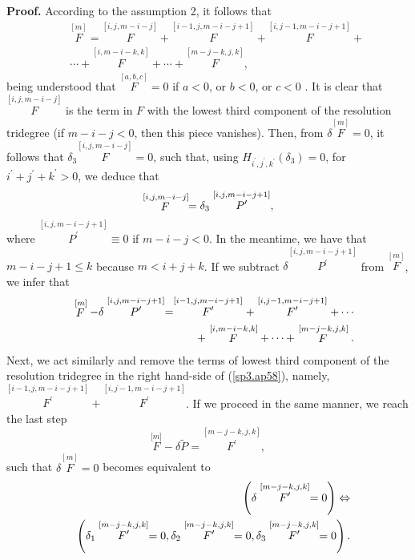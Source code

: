 \documentclass[a4paper,12pt]{article}
\begin{document}
{\textbf{Proof.}} According to the assumption 2, it follows that 
\begin{eqnarray}
&&\stackrel{[m]}{F}=\stackrel{[i,j,m-i-j]}{F}+\stackrel{[i-1,j,m-i-j+1]}{F}+%
\stackrel{[i,j-1,m-i-j+1]}{F}+  \nonumber \\
&&\cdots +\stackrel{[i,m-i-k,k]}{F}+\cdots +\stackrel{[m-j-k,j,k]}{F},
\label{sp3.ap56}
\end{eqnarray}
being understood that $\stackrel{[a,b,c]}{F}=0$ if $a<0$, or $b<0$, or $c<0$%
. It is clear that $\stackrel{[i,j,m-i-j]}{F}$ is the term in $F$ with the
lowest third component of the resolution tridegree (if $m-i-j<0$, then this
piece vanishes). Then, from $\delta \stackrel{[m]}{F}=0$, it follows that $%
\delta _{3}\stackrel{[i,j,m-i-j]}{F}=0$, such that, using $H_{i^{\prime
},j^{\prime },k^{\prime }}\left( \delta _{3}\right) =0$, for $i^{\prime
}+j^{\prime }+k^{\prime }>0$, we deduce that 
\begin{equation}
\stackrel{\lbrack i,j,m-i-j]}{F}=\delta _{3}\stackrel{[i,j,m-i-j+1]}{%
P^{\prime }},  \label{sp3.ap57}
\end{equation}
where $\stackrel{[i,j,m-i-j+1]}{P^{\prime }}\equiv 0$ if $m-i-j<0$. In the
meantime, we have that $m-i-j+1\leq k$ because $m<i+j+k$. If we subtract $%
\delta \stackrel{[i,j,m-i-j+1]}{P^{\prime }}$ from $\stackrel{[m]}{F}$, we
infer that 
\begin{eqnarray}
&&\stackrel{[m]}{F}-\delta \stackrel{[i,j,m-i-j+1]}{P^{\prime }}=\stackrel{%
[i-1,j,m-i-j+1]}{F^{\prime }}+\stackrel{[i,j-1,m-i-j+1]}{F^{\prime }}+\cdots
\nonumber \\
&&+\stackrel{[i,m-i-k,k]}{F}+\cdots +\stackrel{[m-j-k,j,k]}{F}.
\label{sp3.ap58}
\end{eqnarray}
Next, we act similarly and remove the terms of lowest third component of the
resolution tridegree in the right hand-side of (\ref{sp3.ap58}), namely, $%
\stackrel{[i-1,j,m-i-j+1]}{F^{\prime }}+\stackrel{[i,j-1,m-i-j+1]}{F^{\prime
}}$. If we proceed in the same manner, we reach the last step 
\begin{equation}
\stackrel{\lbrack m]}{F}-\delta \tilde{P}=\stackrel{[m-j-k,j,k]}{F^{\prime }}%
,  \label{sp3.ap59}
\end{equation}
such that $\delta \stackrel{[m]}{F}=0$ becomes equivalent to 
\begin{eqnarray}
&&\left( \delta \stackrel{[m-j-k,j,k]}{F^{\prime }}=0\right) \Leftrightarrow
\nonumber \\
&&\left( \delta _{1}\stackrel{[m-j-k,j,k]}{F^{\prime }}=0,\delta _{2}%
\stackrel{[m-j-k,j,k]}{F^{\prime }}=0,\delta _{3}\stackrel{[m-j-k,j,k]}{%
F^{\prime }}=0\right) .  \label{sp3.ap60}
\end{eqnarray}
\end{document}
